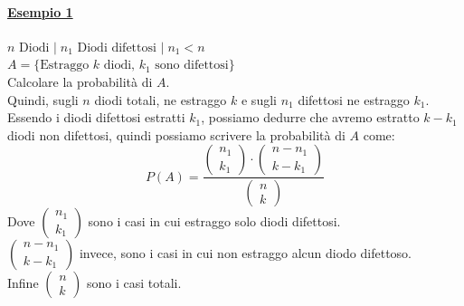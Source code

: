 \documentclass{article}
\begin{document}
\paragraph{\underline{Esempio 1}}
$n \text{ Diodi } \big|\; n_1 \text{ Diodi difettosi } \big|\; n_1 < n$ \\
$A = \{\text{Estraggo } k \text{ diodi, } k_1 \text{ sono difettosi}\}$ \\
Calcolare la probabilità di $A$. \\
Quindi, sugli $n$ diodi totali, ne estraggo $k$ e sugli $n_1$ difettosi ne estraggo $k_1$. \\
Essendo i diodi difettosi estratti $k_1$, possiamo dedurre che avremo estratto $k-k_1$ diodi non difettosi, quindi possiamo scrivere la probabilità di $A$ come:
\[P(A) = \frac{\left( \begin{matrix} n_1 \\ k_1\end{matrix}\right) \cdot \left(\begin{matrix} n-n_1 \\ k-k_1\end{matrix}\right) }{\left(\begin{matrix} n \\ k\end{matrix}\right)}\]
Dove $\left( \begin{matrix} n_1 \\ k_1\end{matrix}\right)$ sono i casi in cui estraggo solo diodi difettosi. \\
$\left(\begin{matrix} n- n_1 \\ k-k_1\end{matrix}\right)$ invece, sono i casi in cui non estraggo alcun diodo difettoso. \\
Infine $\left(\begin{matrix} n \\ k\end{matrix}\right)$ sono i casi totali.
\end{document}
